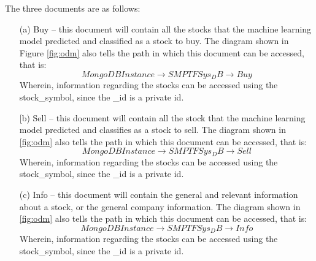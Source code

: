 The three documents are as follows:
\begin{itemize}
    \item[(a)] Buy – this document will contain all the stocks that 
    the machine learning model predicted and classified as a stock to buy. 
    The diagram shown in Figure \ref{fig:odm} also tells the path in which this 
    document can be accessed, that is: $$ MongoDB Instance \rightarrow SMPTFSys_DB 
    \rightarrow Buy$$ Wherein, information regarding the stocks can be accessed using 
    the stock\_symbol, since the \_id is a private id.
    \item[[b)] Sell – this document will contain all the stock that the 
    machine learning model predicted and classifies as a stock to sell. 
    The diagram shown in \ref{fig:odm} also tells the path in which this 
    document can be accessed, that is: $$ MongoDB Instance \rightarrow 
    SMPTFSys_DB \rightarrow Sell$$
     Wherein, information regarding the stocks can be accessed using the 
     stock\_symbol, since the \_id is a private id.
    \item[(c)] Info – this document will contain the general and relevant 
    information about a stock, or the general company information. 
    The diagram shown in \ref{fig:odm} also tells the path in which this 
    document can be accessed, that is: 
    $$ MongoDB Instance \rightarrow SMPTFSys_DB \rightarrow Info $$ 
    Wherein, information regarding the stocks can be accessed using the 
    stock\_symbol, since the \_id is a private id.
\end{itemize}